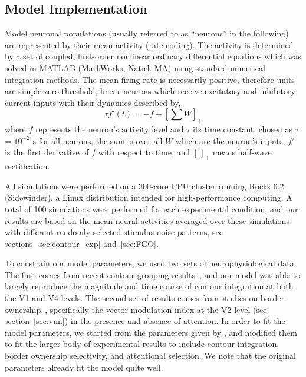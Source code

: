 {\subsection{Model Implementation}
\label{sec:implementation}
Model neuronal populations (usually referred to as ``neurons'' in the
following) are represented  by their mean  activity (rate coding). 
The activity is determined by a set of
coupled, first-order nonlinear ordinary differential equations which
was solved in MATLAB (MathWorks, Natick MA) using standard numerical
integration methods. 
The mean firing rate is necessarily positive, therefore units
are simple zero-threshold, linear
neurons which receive excitatory and inhibitory current inputs with
their dynamics described by,
\begin{equation}
\label{eq:1}
\tau f'(t) = -f + \left[ \sum W \right]_{+}
\end{equation}
where $f$ represents the neuron's activity level and $\tau$ its time
constant, chosen as $\tau$ = $10^{-2}$ s for all neurons,
 the sum is over all $W$ which are the neuron's inputs, 
%
$f'$ is the first derivative of $f$ with respect to
time, and $[\,]_{+}$ means half-wave rectification.

All simulations were performed on a 
300-core CPU cluster running Rocks 6.2 (Sidewinder), a Linux
distribution intended for high-performance computing.  A total of 100
simulations were performed for each experimental condition, and our
results are based on the mean neural activities averaged over these
simulations with different randomly selected stimulus noise patterns, see
sections~\ref{sec:contour_exp} and~\ref{sec:FGO}.

To constrain our model parameters, we used two sets of
neurophysiological data. The first comes from recent contour grouping
results~\citep{Chen_etal14}, and our model was able to largely
reproduce the magnitude and time course of contour integration at both
the V1 and V4 levels. The second set of results comes from studies on
border ownership~\citep{Qiu_etal07}, specifically the 
vector
modulation index at the V2 level
(see section~\ref{sec:vmi})
 in the presence and absence of
attention. In order to fit the model parameters, we started from the
parameters given by \cite{Mihalas_etal11b}, and modified them to fit
the larger body of experimental results to include contour
integration, border ownership selectivity, and attentional selection. 
We note that the original parameters already fit the
model quite well.

}
